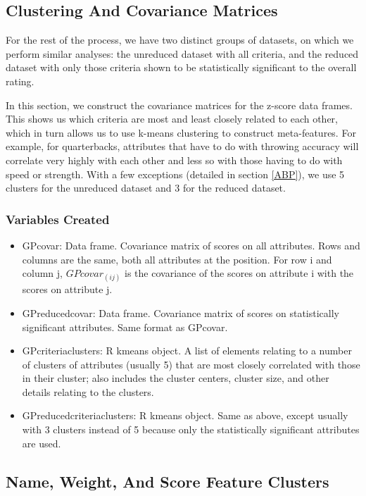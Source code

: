 \documentclass[11pt]{article}
\begin{document}
\subsection{Clustering And Covariance Matrices}

For the rest of the process, we have two distinct groups of datasets, on which we perform similar analyses: the unreduced dataset with all criteria, and the reduced dataset with only those criteria shown to be statistically significant to the overall rating. 

In this section, we construct the covariance matrices for the z-score data frames. This shows us which criteria are most and least closely related to each other, which in turn allows us to use k-means clustering to construct meta-features. For example, for quarterbacks, attributes that have to do with throwing accuracy will correlate very highly with each other and less so with those having to do with speed or strength. With a few exceptions (detailed in section \ref{ABP}), we use 5 clusters for the unreduced dataset and 3 for the reduced dataset.

\subsubsection{Variables Created}

\begin{itemize}
\item{GPcovar}: Data frame. Covariance matrix of scores on all attributes. Rows and columns are the same, both all attributes at the position. For row i and column j, $GPcovar_(ij)$ is the covariance of the scores on attribute i with the scores on attribute j. 
\item{GPreducedcovar}: Data frame. Covariance matrix of scores on statistically significant attributes. Same format as GPcovar.
\item{GPcriteriaclusters}: R kmeans object. A list of elements relating to a number of clusters of attributes (usually 5) that are most closely correlated with those in their cluster; also includes the cluster centers, cluster size, and other details relating to the clusters.
\item{GPreducedcriteriaclusters}: R kmeans object. Same as above, except usually with 3 clusters instead of 5 because only the statistically significant attributes are used.
\end{itemize}

\subsection{Name, Weight, And Score Feature Clusters}
\end{document}
